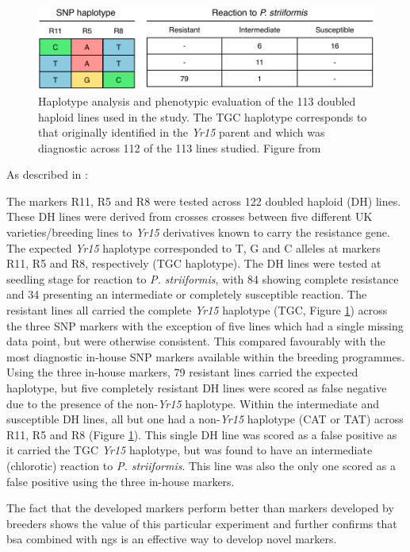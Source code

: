 \begin{figure}
\includegraphics[width=1\textwidth]{Yr15/Figures/breedersTest.pdf}
\caption[Haplotype and phenotype of 113 doubled haploid lines]{Haplotype analysis and phenotypic evaluation of the 113 doubled haploid lines used in the study. The TGC haplotype corresponds to that originally identified in the \textit{Yr15} parent and which was diagnostic across 112 of the 113 lines studied. Figure from \citep{Ramirez-Gonzalez2015b}}
\label{fig:yr15:breeders}
\end{figure}

As described in \citet{Ramirez-Gonzalez2015b}:  
\begin{blockquote} The markers
 R11, R5 and R8 were tested across 122 doubled haploid (DH) lines. 
These DH lines were derived from crosses crosses between five different UK varieties/breeding lines to \textit{Yr15} derivatives known to carry the resistance gene. 
The expected \textit{Yr15} haplotype corresponded to T, G and C alleles at markers R11, R5 and R8, respectively (TGC haplotype). 
The DH lines were tested at seedling stage for reaction to \textit{P. striiformis}, with 84 showing complete resistance and 34 presenting an intermediate or completely susceptible reaction.
The resistant lines all carried the complete \textit{Yr15} haplotype (TGC, Figure \ref{fig:yr15:breeders}) across the three SNP markers with the exception of five lines which had a single missing data point, but were otherwise consistent. 
This compared favourably with the most diagnostic in-house SNP markers available within the breeding programmes. 
Using the three in-house markers, 79 resistant lines carried the expected haplotype, but five completely resistant DH lines were scored as false negative due to the presence of the non-\textit{Yr15} haplotype. 
Within the intermediate and susceptible DH lines, all but one had a non-\textit{Yr15} haplotype (CAT or TAT) across R11, R5 and R8 (Figure \ref{fig:yr15:breeders}). This single DH line was scored as a false positive as it carried the TGC \textit{Yr15} haplotype, but was found to have an intermediate (chlorotic) reaction to \textit{P. striiformis}. This line was also the only one scored as a false positive using the three in-house markers.
\end{blockquote}
The fact that the developed markers perform better than markers developed by breeders shows the value of this particular experiment and further confirms that \gls{bsa} combined with \gls{ngs} is an effective way to develop novel markers. 

